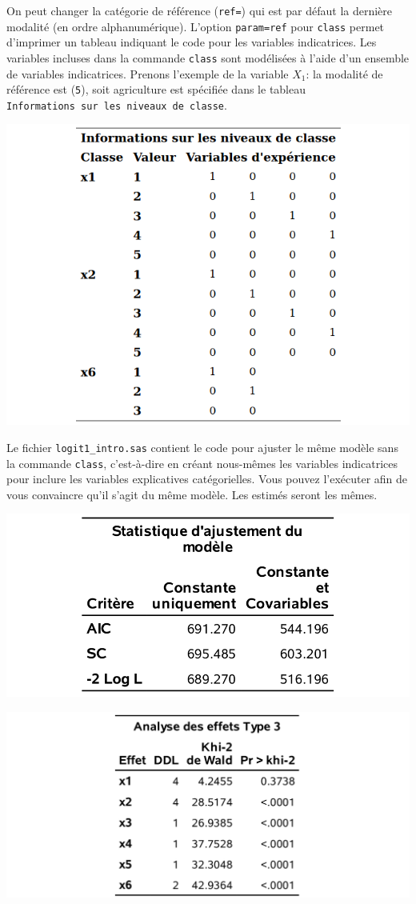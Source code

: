 \documentclass[
  11pt,
  letterpaper,
]{book}
\theoremstyle{definition}
\theoremstyle{definition}
\theoremstyle{definition}
\theoremstyle{remark}
\begin{document}
On peut changer la catégorie de référence (\texttt{ref=}) qui est par défaut la dernière modalité (en ordre alphanumérique). L'option \texttt{param=ref} pour \texttt{class} permet d'imprimer un tableau indiquant le code pour les variables indicatrices.
Les variables incluses dans la commande \texttt{class} sont modélisées à l'aide d'un ensemble de variables indicatrices. Prenons l'exemple de la variable \(X_1\): la modalité de référence est (\texttt{5}), soit agriculture est spécifiée dans le tableau \texttt{Informations\ sur\ les\ niveaux\ de\ classe}.

\begin{center}\includegraphics[width=0.75\linewidth]{figures/03-logistic-e9} \end{center}

Le fichier \texttt{logit1\_intro.sas} contient le code pour ajuster le même modèle sans la commande \texttt{class}, c'est-à-dire en créant nous-mêmes les variables indicatrices pour inclure les variables explicatives catégorielles. Vous pouvez l'exécuter afin de vous convaincre qu'il s'agit du même modèle. Les estimés seront les mêmes.

\begin{center}\includegraphics[width=0.65\linewidth]{figures/03-logistic-e5} \end{center}

\begin{center}\includegraphics[width=0.75\linewidth]{figures/03-logistic-e6} \end{center}
\end{document}
